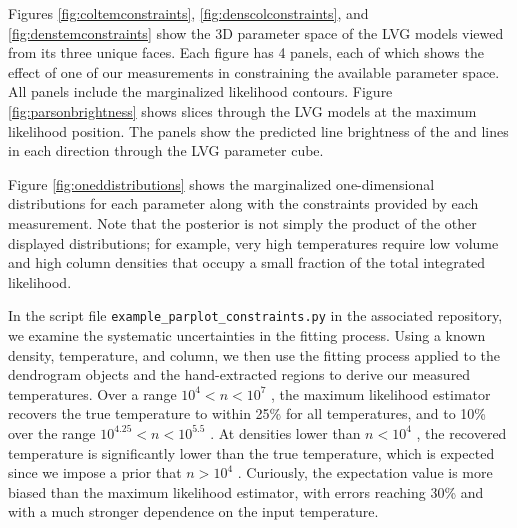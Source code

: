 Figures \ref{fig:coltemconstraints}, \ref{fig:denscolconstraints}, and
\ref{fig:denstemconstraints} show the 3D parameter space of the LVG models
viewed from its three unique faces.  Each figure has 4 panels, each of which
shows the effect of one of our measurements in constraining the available
parameter space.  All panels include the marginalized likelihood contours.
Figure \ref{fig:parsonbrightness} shows slices through the LVG models at the
maximum likelihood position.  The panels show the predicted line brightness of
the \threeohthree and \threetwoone lines in each direction through the LVG
parameter cube.

Figure \ref{fig:oneddistributions} shows the marginalized one-dimensional
distributions for each parameter along with the constraints provided by each
measurement.  Note that the posterior is not simply the product of the other
displayed distributions; for example, very high temperatures require low
volume and high column densities that occupy a small fraction of the total
integrated likelihood.

In the script file \texttt{example\_parplot\_constraints.py} in the associated
repository, we examine the systematic uncertainties in the fitting process.
Using a known density, temperature, and column, we then use the fitting process
applied to the dendrogram objects and the hand-extracted regions to derive our
measured temperatures.  Over a range $10^4 < n < 10^7$ \percc, the maximum
likelihood estimator recovers the true temperature to within 25\% for all
temperatures, and to 10\% over the range $10^{4.25} < n < 10^5.5$ \percc.  At
densities lower than $n<10^4$ \percc, the recovered temperature is
significantly lower than the true temperature, which is expected since we
impose a prior that $n>10^4$ \percc.  Curiously, the expectation value is more
biased than the maximum likelihood estimator, with errors reaching 30\% and
with a much stronger dependence on the input temperature.

